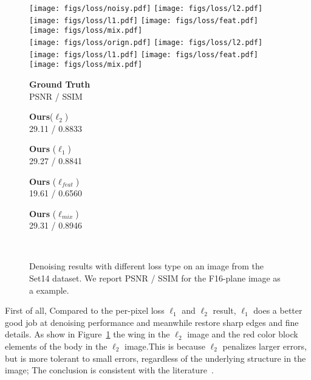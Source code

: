 \begin{figure}[t]
\centering
  \texttt{[image: figs/loss/noisy.pdf]}
  \texttt{[image: figs/loss/l2.pdf]}
  \texttt{[image: figs/loss/l1.pdf]}
  \texttt{[image: figs/loss/feat.pdf]}
  \texttt{[image: figs/loss/mix.pdf]}  \\{}
  \texttt{[image: figs/loss/orign.pdf]}
  \texttt{[image: figs/loss/l2.pdf]}
  \texttt{[image: figs/loss/l1.pdf]}
  \texttt{[image: figs/loss/feat.pdf]}
  \texttt{[image: figs/loss/mix.pdf]} \\
   \begin{minipage}{0.19\textwidth}
        \centering \textbf{Ground Truth} \\ PSNR / SSIM
   \end{minipage}
   \begin{minipage}{0.19\textwidth}
     \centering \textbf{Ours}($\ell_{2}$) \\ 29.11 / 0.8833
   \end{minipage}
   \begin{minipage}{0.19\textwidth}
     \centering \textbf{Ours} ($\ell_{1}$) \\ 29.27 / 0.8841
   \end{minipage}
   \begin{minipage}{0.19\textwidth}
     \centering \textbf{Ours} ($\ell_{feat}$) \\  19.61 / 0.6560
   \end{minipage}
   \begin{minipage}{0.19\textwidth}
     \centering \textbf{Ours} ($\ell_{mix}$) \\  29.31 / 0.8946
   \end{minipage} \\
  \caption{Denoising results with different loss type on an image from the
    Set14 dataset. We report PSNR / SSIM for the  F16-plane image as a example. 
  }
  \vspace{-4mm}
  \label{fig:l1-l2-feat-results}
\end{figure}

First of all, Compared to the per-pixel loss $\ell_{1}$ and $\ell_{2}$ result, $\ell_{1}$ does a better good job at denoising performance and meanwhile restore sharp edges and fine details. As show in Figure~\ref{fig:l1-l2-feat-results}
the wing in the $\ell_{2}$ image and the red color block elements of the body in the $\ell_{2}$ image.This is because $\ell_{2}$ penalizes larger errors, but is more tolerant to small errors, regardless of the underlying structure in the image; The conclusion is consistent with the literature~\cite{Zhao2015}.

